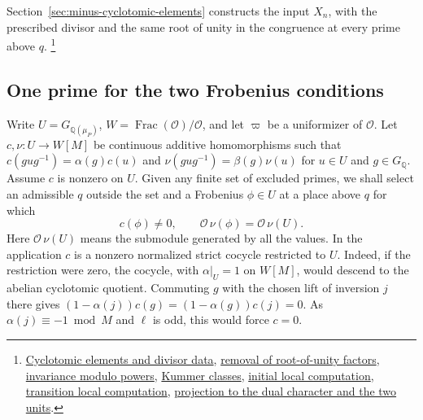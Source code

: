 Section~\ref{sec:minus-cyclotomic-elements} constructs the input
\(X_n\), with the prescribed divisor and the same root of unity in
the congruence at every prime above \(q\).
\footnote{\href{https://github.com/ChristianKudeba/alpoge-rh-verification/blob/alpoge-source-7cbf7a0c/src/Development/AutomorphicArithmetic/AutomorphicVarieties/PrimitiveFrobeniusFixed/PlaceEmb.lean}{Cyclotomic elements and divisor data},
\href{https://github.com/ChristianKudeba/alpoge-rh-verification/blob/alpoge-source-7cbf7a0c/src/Development/AutomorphicArithmetic/AutomorphicVarieties/PrimitiveFrobeniusFixed/SysOfLax.lean}{removal of root-of-unity factors},
\href{https://github.com/ChristianKudeba/alpoge-rh-verification/blob/alpoge-source-7cbf7a0c/src/Development/AutomorphicArithmetic/AutomorphicVarieties/PrimitiveFrobeniusFixed/DerInv.lean}{invariance modulo powers},
\href{https://github.com/ChristianKudeba/alpoge-rh-verification/blob/alpoge-source-7cbf7a0c/src/Development/AutomorphicArithmetic/AutomorphicVarieties/PrimitiveFrobeniusFixed/KolHom.lean}{Kummer classes},
\href{https://github.com/ChristianKudeba/alpoge-rh-verification/blob/alpoge-source-7cbf7a0c/src/Development/AutomorphicArithmetic/AutomorphicVarieties/PrimitiveFrobeniusFixed/KolInit.lean}{initial local computation},
\href{https://github.com/ChristianKudeba/alpoge-rh-verification/blob/alpoge-source-7cbf7a0c/src/Development/AutomorphicArithmetic/AutomorphicVarieties/PrimitiveFrobeniusFixed/KolStep.lean}{transition local computation},
\href{https://github.com/ChristianKudeba/alpoge-rh-verification/blob/alpoge-source-7cbf7a0c/src/Development/AutomorphicArithmetic/AutomorphicVarieties/PrimitiveFrobeniusFixed/NuSysEx.lean}{projection to the dual character and the two units}.}

\subsection{One prime for the two Frobenius conditions}
\label{sec:minus-frobenius}

Write \(U=G_{\mathbb Q(\mu_P)}\), \(W=\operatorname{Frac}(\mathcal O)/\mathcal O\),
and let \(\varpi\) be a uniformizer of \(\mathcal O\).
Let \(c,\nu:U\to W[M]\) be continuous additive homomorphisms such
that \(c(gug^{-1})=\alpha(g)c(u)\) and
\(\nu(gug^{-1})=\beta(g)\nu(u)\) for \(u\in U\) and
\(g\in G_{\mathbb Q}\). Assume \(c\) is nonzero on \(U\).
Given any finite set of excluded primes, we shall select an
admissible \(q\) outside the set and a Frobenius \(\phi\in U\) at
a place above \(q\) for which
\[
    c(\phi)\ne0,\qquad \mathcal O\,\nu(\phi)=
          \mathcal O\,\nu(U).
\]
Here \(\mathcal O\,\nu(U)\) means the submodule generated by all
the values. In the application \(c\) is a nonzero normalized strict
cocycle restricted to \(U\). Indeed, if the restriction were zero,
the cocycle, with \(\alpha|_U=1\) on \(W[M]\), would descend to
the abelian cyclotomic quotient. Commuting \(g\) with the
chosen lift of inversion \(j\) there gives
\((1-\alpha(j))c(g)=(1-\alpha(g))c(j)=0\). As
\(\alpha(j)\equiv-1\bmod M\) and \(\ell\) is odd, this would
force \(c=0\).

